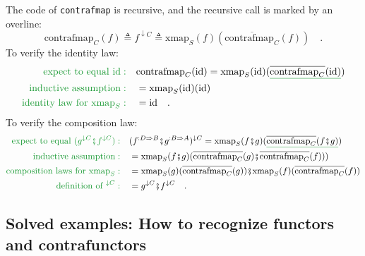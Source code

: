 The code of \lstinline!contrafmap! is recursive, and the recursive
call is marked by an overline: 
\[
\text{contrafmap}_{C}(f)\triangleq f^{\downarrow C}\triangleq\text{xmap}_{S}(f)(\overline{\text{contrafmap}_{C}}(f))\quad.
\]
To verify the identity law:
\begin{align*}
{\color{greenunder}\text{expect to equal }\text{id}:}\quad & \text{contrafmap}_{C}(\text{id})=\text{xmap}_{S}(\text{id})(\gunderline{\overline{\text{contrafmap}_{C}}(\text{id})})\\
{\color{greenunder}\text{inductive assumption}:}\quad & =\text{xmap}_{S}(\text{id})(\text{id})\\
{\color{greenunder}\text{identity law for }\text{xmap}_{S}:}\quad & =\text{id}\quad.
\end{align*}
To verify the composition law:
\begin{align*}
{\color{greenunder}\text{expect to equal }(g^{\downarrow C}\bef f^{\downarrow C}):}\quad & (f^{:D\Rightarrow B}\bef g^{:B\Rightarrow A})^{\downarrow C}=\text{xmap}_{S}(f\bef g)(\gunderline{\overline{\text{contrafmap}_{C}}(f\bef g)})\\
{\color{greenunder}\text{inductive assumption}:}\quad & =\text{xmap}_{S}(f\bef g)(\overline{\text{contrafmap}_{C}}(g)\bef\overline{\text{contrafmap}_{C}}(f)))\\
{\color{greenunder}\text{composition laws for }\text{xmap}_{S}:}\quad & =\text{xmap}_{S}(g)(\overline{\text{contrafmap}_{C}}(g))\bef\text{xmap}_{S}(f)(\overline{\text{contrafmap}_{C}}(f))\\
{\color{greenunder}\text{definition of }^{\downarrow C}:}\quad & =g^{\downarrow C}\bef f^{\downarrow C}\quad.
\end{align*}


\subsection{Solved examples: How to recognize functors and contrafunctors\label{subsec:Solved-examples:-How-to-recognize-functors}}

